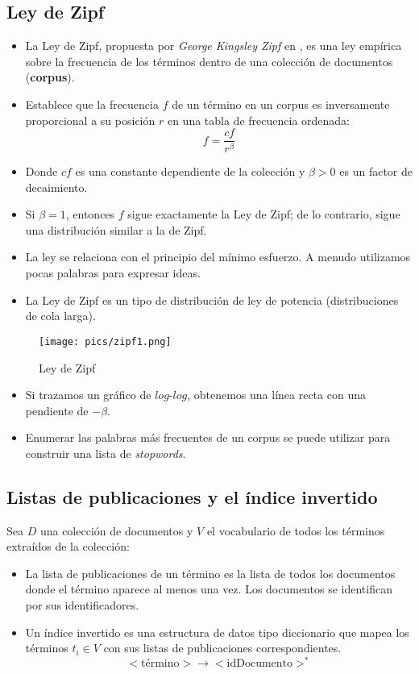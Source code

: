 \subsection{Ley de Zipf}
\begin{itemize}
   \item La Ley de Zipf, propuesta por \emph{George Kingsley Zipf} en \cite{zipf1935}, es una ley empírica sobre la frecuencia de los términos dentro de una colección de documentos (\textbf{corpus}).
   \item Establece que la frecuencia $f$ de un término en un corpus es inversamente proporcional a su posición $r$ en una tabla de frecuencia ordenada:
   \begin{equation}
      f = \frac{cf}{r^{\beta}}
   \end{equation}
   \item Donde $cf$ es una constante dependiente de la colección y $\beta > 0$ es un factor de decaimiento.
   \item Si $\beta = 1$, entonces $f$ sigue exactamente la Ley de Zipf; de lo contrario, sigue una distribución similar a la de Zipf.
   \item La ley se relaciona con el principio del mínimo esfuerzo. A menudo utilizamos pocas palabras para expresar ideas.
   \item La Ley de Zipf es un tipo de distribución de ley de potencia (distribuciones de cola larga).
\end{itemize}

\begin{figure}[h!]
	\centering
	\texttt{[image: pics/zipf1.png]}
	\caption{Ley de Zipf}
\end{figure}

\begin{itemize}
   \item Si trazamos un gráfico de $log$-$log$, obtenemos una línea recta con una pendiente de $-\beta$.
   \item Enumerar las palabras más frecuentes de un corpus se puede utilizar para construir una lista de \emph{stopwords}.
\end{itemize}
\subsection{Listas de publicaciones y el índice invertido}
Sea $D$ una colección de documentos y $V$ el vocabulario de todos los términos extraídos de la colección:

\begin{itemize}
\item La lista de publicaciones de un término es la lista de todos los documentos donde el término aparece al menos una vez. Los documentos se identifican por sus identificadores.
\item Un índice invertido es una estructura de datos tipo diccionario que mapea los términos $t_{i} \in V$ con sus listas de publicaciones correspondientes.
\begin{displaymath}
<\text{término}> \rightarrow <\text{idDocumento}>^*
\end{displaymath}
\end{itemize}

